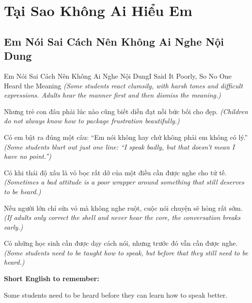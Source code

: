 \chapter{Tại Sao Không Ai Hiểu Em}

\section{Em Nói Sai Cách Nên Không Ai Nghe Nội Dung}
\begin{truyen}{Em Nói Sai Cách Nên Không Ai Nghe Nội Dung}{I Said It Poorly, So No One Heard the Meaning}
\textit{(Some students react clumsily, with harsh tones and difficult expressions. Adults hear the manner first and then dismiss the meaning.)}

Nhưng trẻ con đâu phải lúc nào cũng biết diễn đạt nỗi bức bối cho đẹp.
\textit{(Children do not always know how to package frustration beautifully.)}

Có em bật ra đúng một câu: “Em nói không hay chứ không phải em không có lý.”
\textit{(Some students blurt out just one line: “I speak badly, but that doesn't mean I have no point.”)}

Có khi thái độ xấu là vỏ bọc rất dở của một điều cần được nghe cho tử tế.
\textit{(Sometimes a bad attitude is a poor wrapper around something that still deserves to be heard.)}

Nếu người lớn chỉ sửa vỏ mà không nghe ruột, cuộc nói chuyện sẽ hỏng rất sớm.
\textit{(If adults only correct the shell and never hear the core, the conversation breaks early.)}

\end{truyen}

\begin{baihoc}
Có những học sinh cần được dạy cách nói, nhưng trước đó vẫn cần được nghe.
\textit{(Some students need to be taught how to speak, but before that they still need to be heard.)}
\end{baihoc}

\begin{ghinhoanh}
\textbf{Short English to remember:}

Some students need to be heard before they can learn how to speak better.

\end{ghinhoanh}

